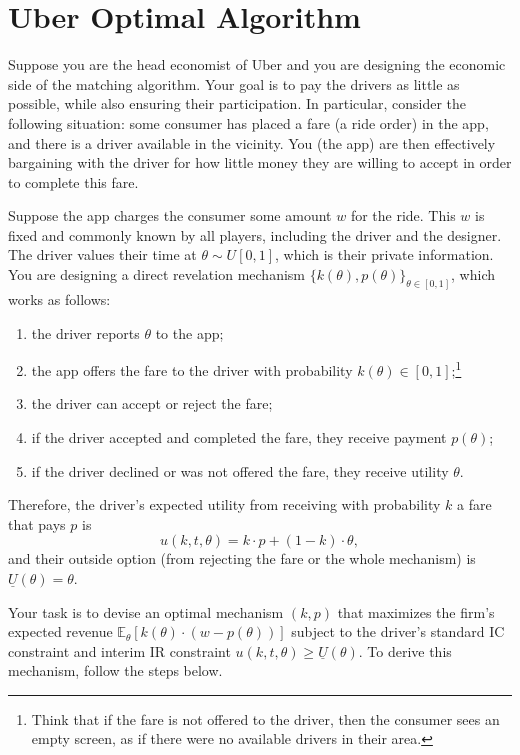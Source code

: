 \documentclass[a4paper]{article}
\begin{document}
	
\section{Uber Optimal Algorithm}
Suppose you are the head economist of Uber and you are designing the economic side of the matching algorithm. Your goal is to pay the drivers as little as possible, while also ensuring their participation. In particular, consider the following situation: some consumer has placed a fare (a ride order) in the app, and there is a driver available in the vicinity. You (the app) are then effectively bargaining with the driver for how little money they are willing to accept in order to complete this fare.

Suppose the app charges the consumer some amount $w$ for the ride. This $w$ is fixed and commonly known by all players, including the driver and the designer. The driver values their time at $\theta \sim U[0,1]$, which is their private information. You are designing a direct revelation mechanism $\{k(\theta),p(\theta)\}_{\theta\in[0,1]}$, which works as follows:
\begin{enumerate}[label=(\roman{enumi})]
	\item the driver reports $\theta$ to the app;
	\item the app offers the fare to the driver with probability $k(\theta) \in [0,1]$;\footnote{Think that if the fare is not offered to the driver, then the consumer sees an empty screen, as if there were no available drivers in their area.}
	\item the driver can accept or reject the fare;
	\item if the driver accepted and completed the fare, they receive payment $p(\theta)$;
	\item if the driver declined or was not offered the fare, they receive utility $\theta$.
\end{enumerate}

Therefore, the driver's expected utility from receiving with probability $k$ a fare that pays $p$ is
$$u(k,t,\theta) = k \cdot p + (1-k) \cdot \theta,$$
and their outside option (from rejecting the fare or the whole mechanism) is $\underline{U}(\theta) = \theta$.

Your task is to devise an optimal mechanism $(k,p)$ that maximizes the firm's expected revenue $\mathbb{E}_\theta [k(\theta) \cdot (w-p(\theta))]$ subject to the driver's standard IC constraint and interim IR constraint $u(k,t,\theta) \geq \underline{U}(\theta)$. To derive this mechanism, follow the steps below.
\end{document}
